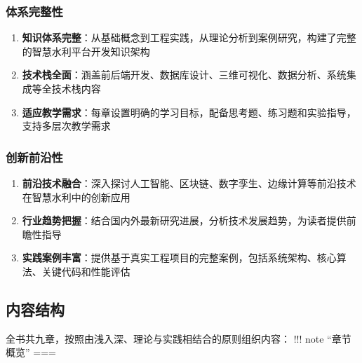 \subsubsection{体系完整性}\label{ux4f53ux7cfbux5b8cux6574ux6027} \begin{enumerate} \def\labelenumi{\arabic{enumi}.}
\tightlist \item \textbf{知识体系完整}：从基础概念到工程实践，从理论分析到案例研究，构建了完整的智慧水利平台开发知识架构 \item
\textbf{技术栈全面}：涵盖前后端开发、数据库设计、三维可视化、数据分析、系统集成等全技术栈内容 \item \textbf{适应教学需求}：每章设置明确的学习目标，配备思考题、练习题和实验指导，支持多层次教学需求
\end{enumerate} \subsubsection{创新前沿性}\label{ux521bux65b0ux524dux6cbfux6027} \begin{enumerate}
\def\labelenumi{\arabic{enumi}.} \tightlist \item \textbf{前沿技术融合}：深入探讨人工智能、区块链、数字孪生、边缘计算等前沿技术在智慧水利中的创新应用 \item
\textbf{行业趋势把握}：结合国内外最新研究进展，分析技术发展趋势，为读者提供前瞻性指导 \item \textbf{实践案例丰富}：提供基于真实工程项目的完整案例，包括系统架构、核心算法、关键代码和性能评估
\end{enumerate} \subsection{内容结构}\label{ux5185ux5bb9ux7ed3ux6784} 全书共九章，按照由浅入深、理论与实践相结合的原则组织内容： !!! note ``章节概览'' ===
